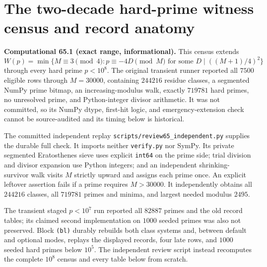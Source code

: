 \documentclass[10pt,reqno]{amsart}
\theoremstyle{definition}
\newcommand{\1}{\mathbf 1}
\begin{document}
\section{The two-decade hard-prime witness census and record anatomy}
\label{sec:two-decade-census}
\medskip\noindent\textbf{Computational 65.1 (exact range,
informational).}
This census extends
\begin{equation}\tag{65.1}
 W(p)=\min\{M\equiv3\pmod4:p\equiv-4D\pmod M
              \text{ for some }D\mid((M+1)/4)^2\}
\end{equation}
through every hard prime $p<10^8$.  The original transient runner reported
all $7500$ eligible rows through $M=30000$, containing $244216$ residue
classes, a segmented NumPy prime bitmap, an increasing-modulus walk, exactly
$719781$ hard primes, no unresolved prime, and Python-integer divisor
arithmetic.  It was not committed, so its NumPy dtype, first-hit logic, and
emergency-extension check cannot be source-audited and its timing below is
historical.

The committed independent replay
\texttt{scripts/review65\_independent.py} supplies the durable full check.
It imports neither \texttt{verify.py} nor SymPy.  Its private segmented
Eratosthenes sieve uses explicit \texttt{int64} on the prime side; trial
division and divisor expansion use Python integers; and an independent
shrinking-survivor walk visits $M$ strictly upward and assigns each prime
once.  An explicit leftover assertion fails if a prime requires $M>30000$.
It independently obtains all $244216$ classes, all $719781$ primes and
minima, and largest needed modulus $2495$.

The transient staged $p<10^7$ run reported all $82887$ primes and the old
record tables; its claimed second implementation on $1000$ seeded primes
was also not preserved.  Block \texttt{(bl)} durably rebuilds both class
systems and, between default and optional modes, replays the displayed
records, four late rows, and $1000$ seeded hard primes below $10^5$.
The independent review script instead recomputes the complete $10^8$ census
and every table below from scratch.
\end{document}
